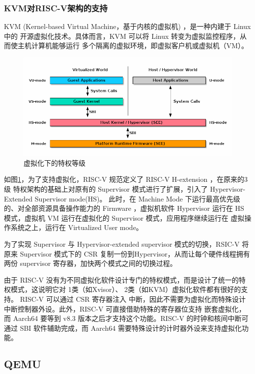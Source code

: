 \documentclass{../runikraft-report}
\begin{document}
\subsubsection{KVM对RISC-V架构的支持}
KVM (Kernel-based Virtual Machine，基于内核的虚拟机)  ，是一种内建于 Linux 中的
开源虚拟化技术。具体而言，KVM 可以将 Linux 转变为虚拟监控程序，从而使主机计算机能够运行
多个隔离的虚拟环境，即虚拟客户机或虚拟机（VM）。
\begin{figure}[!hbt]
	\centering
	\includegraphics[width=0.9\linewidth]{assets/riscv-sbi-intro2.png}
	\caption{虚拟化下的特权等级}
	\label{fig:w4}
\end{figure}

如图\ref{fig:w4}，为了支持虚拟化，RISC-V 规范定义了 RISC-V H-extension ，在原来的3级
特权架构的基础上对原有的 Supervisor 模式进行了扩展，引入了 Hypervisor-Extended Supervisor mode(HS)。
此时，在 Machine Mode 下运行最高优先级的、对全部资源具备操作能力的 Firmware ，虚拟机软件
Hypervisor 运行在 HS 模式，虚拟机 VM 运行在虚拟化的 Supervisor 模式，应用程序继续运行在
虚拟操作系统之上，运行在 Virtualized User mode。

为了实现 Supervisor 与 Hypervisor-extended supervisor 模式的切换，RSIC-V 将原来
Supervisor 模式下的 CSR 复制一份到Hypervisor，从而让每个硬件线程拥有两份 supervisor
寄存器，加快两个模式之间的切换过程。

由于 RISC-V 没有为不同虚拟化软件设计专门的特权模式，而是设计了统一的特权模式，这说明它对
1类（如Xvisor）、 2类（如KVM）虚拟化软件都有很好的支持。 RISC-V 可以通过 CSR 寄存器注入
中断，因此不需要为虚拟化而特殊设计中断控制器外设。此外，RISC-V 可直接借助特殊的寄存器位支持
嵌套虚拟化，而 Aarch64 要等到 v8.3 版本之后才支持这个功能。RISC-V 的时钟和核间中断可通过
SBI 软件辅助完成，而 Aarch64 需要特殊设计的计时器外设来支持虚拟化功能。\cite{bib:feasibility-d}

\subsection{QEMU}
\end{document}
